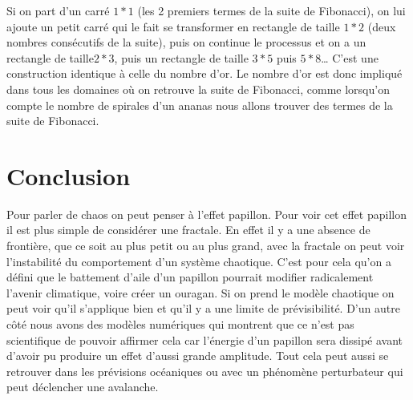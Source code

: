 \documentclass[french,11pt]{report}
\begin{document}
Si on part d’un carré \begin{math}1 * 1\end{math} (les 2 premiers termes de la suite de Fibonacci), on lui ajoute un petit carré qui le fait se transformer en rectangle de taille \begin{math}1 * 2\end{math} (deux nombres consécutifs de la suite), puis on continue le processus et on a un rectangle de taille\begin{math}2 * 3\end{math}, puis un rectangle de taille \begin{math}3 * 5\end{math} puis \begin{math}5 * 8\end{math}… C’est une construction identique à celle du nombre d’or.
Le nombre d’or est donc impliqué dans tous les domaines où on retrouve la suite de Fibonacci, comme lorsqu’on compte le nombre de spirales d’un ananas nous allons trouver des termes de la suite de Fibonacci. 



\chapter{Conclusion}

Pour parler de chaos on peut penser à l’effet papillon. Pour voir cet effet papillon il est plus simple de considérer une fractale. En effet il y a une absence de frontière, que ce soit au plus petit ou au plus grand, avec la fractale on peut voir l’instabilité du comportement d’un système chaotique. C’est pour cela qu’on a défini que le battement d’aile d’un papillon pourrait modifier radicalement l’avenir climatique, voire créer un ouragan. Si on prend le modèle chaotique on peut voir qu’il s’applique bien et qu’il y a une limite de prévisibilité. D’un autre côté nous avons des modèles numériques qui montrent que ce n’est pas scientifique de pouvoir affirmer cela car l’énergie d’un papillon sera dissipé avant d’avoir pu produire un effet d’aussi grande amplitude. Tout cela peut aussi se retrouver dans les prévisions océaniques ou avec un phénomène perturbateur qui peut déclencher une avalanche.\\
\end{document}
